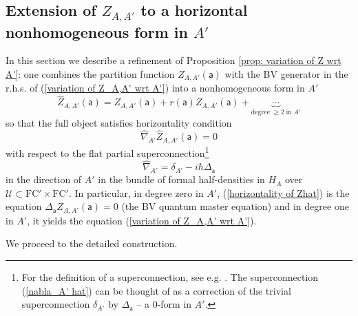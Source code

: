 \documentclass[11pt,a4paper]{amsart}
\theoremstyle{plain} %
\theoremstyle{definition}
\theoremstyle{remark}
\newcommand{\mr}{\mathrm}
\newcommand{\sfa}{\mathsf{a}}
\newcommand{\wh}{\widehat}
\newcommand{\mc}{\mathcal}
\newcommand{\FC}{\mathrm{FC}}
\begin{document}
{\subsection{Extension of $Z_{A,A'}$ to a horizontal nonhomogeneous form in $A'$}\label{sec: ext Z A prime}
In this section we describe a refinement of Proposition \ref{prop: variation of Z wrt A'}: one combines the partition function $Z_{A,A'}(\sfa)$ with the BV generator in the r.h.s. of (\ref{variation of Z_A,A' wrt A'}) into a nonhomogeneous form in $A'$
$$ \wh{Z}_{A,A'}(\sfa)= Z_{A,A'}(\sfa)+ r(\sfa) Z_{A,A'}(\sfa)+\underbrace{\cdots}_{\mr{degree}\;\geq 2\;\mr{in}\; A'}$$
so that the full object satisfies horizontality condition
\begin{equation}\label{horizontality of Zhat}
\wh\nabla_{A'} \wh{Z}_{A,A'}(\sfa)=0
\end{equation}
with respect to the flat partial superconnection\footnote{
For the definition of a superconnection, see e.g. \cite[Definition 1.2]{igusa2009iterated}.
The superconnection (\ref{nabla_A' hat}) can be thought of as a correction of the trivial superconnection $\delta_{A'}$ by  $\Delta_\sfa$ -- a $0$-form in $A'$.
} 
\begin{equation} \label{nabla_A' hat}
\wh\nabla_{A'}=\delta_{A'}-i\hbar \Delta_{\sfa}
\end{equation}
in the direction of $A'$ in the bundle of formal half-densities in $H_A$ over $\mc{U}\subset \FC'\times \FC'$. 
In particular, in degree zero in $A'$, (\ref{horizontality of Zhat}) is the equation $\Delta_\sfa Z_{A,A'}(\sfa)=0$ (the BV quantum master equation) and in degree one in $A'$, it yields the equation (\ref{variation of Z_A,A' wrt A'}).

We proceed to the detailed construction.

}
\end{document}
